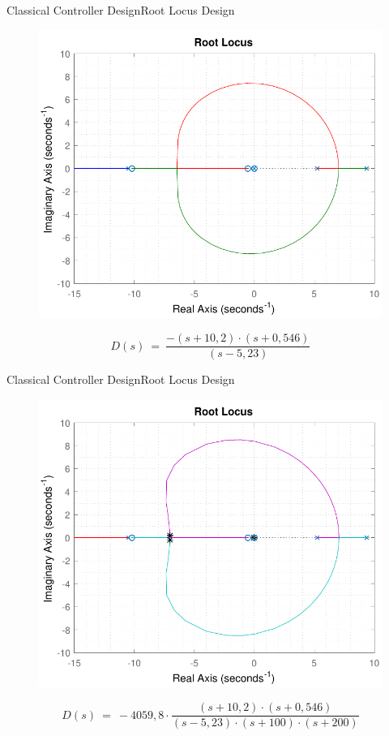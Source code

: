 \begin{frame}{Classical Controller Design}{Root Locus Design}	
	\begin{figure}
		\includegraphics[scale=.55]{Pictures/RLController2}
		\centering
	\end{figure}
\pause
\begin{displaymath}
\si{D(s)\ =\ \frac{-(s + 10,2)\cdot (s + 0,546)}{(s - 5,23)}} \nonumber
\end{displaymath}
\end{frame}

\begin{frame}{Classical Controller Design}{Root Locus Design}
\begin{figure}
	\includegraphics[scale=.55]{Pictures/RLController}
	\centering
\end{figure}	
%
\pause
%
\begin{displaymath}
	\si{D(s)\ =\ -4059,8 \cdot \frac{(s + 10,2)\cdot (s + 0,546)}{(s - 5,23) \cdot (s + 100) \cdot (s + 200)}} \nonumber
\end{displaymath}
\end{frame}

